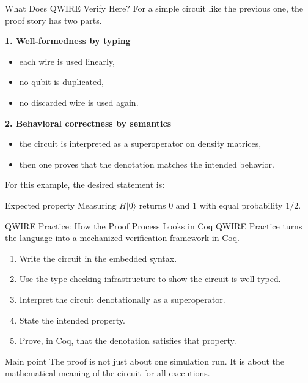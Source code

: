 \documentclass[aspectratio=169]{beamer}
\begin{document}
\begin{frame}{What Does QWIRE Verify Here?}
\justifying
For a simple circuit like the previous one, the proof story has two parts.

\vspace{0.7em}
\textbf{1. Well-formedness by typing}
\begin{itemize}
    \item each wire is used linearly,
    \item no qubit is duplicated,
    \item no discarded wire is used again.
\end{itemize}

\vspace{0.5em}
\textbf{2. Behavioral correctness by semantics}
\begin{itemize}
    \item the circuit is interpreted as a superoperator on density matrices,
    \item then one proves that the denotation matches the intended behavior.
\end{itemize}

\vspace{0.7em}
For this example, the desired statement is:
\begin{block}{Expected property}
Measuring \(H\lvert 0 \rangle\) returns \(0\) and \(1\) with equal probability \(1/2\).
\end{block}
\end{frame}
\begin{frame}{QWIRE Practice: How the Proof Process Looks in Coq}
\justifying
QWIRE Practice turns the language into a mechanized verification framework in Coq.

\vspace{0.7em}
\begin{enumerate}
    \item Write the circuit in the embedded syntax.
    \item Use the type-checking infrastructure to show the circuit is well-typed.
    \item Interpret the circuit denotationally as a superoperator.
    \item State the intended property.
    \item Prove, in Coq, that the denotation satisfies that property.
\end{enumerate}

\vspace{0.7em}
\begin{alertblock}{Main point}
The proof is not just about one simulation run.  
It is about the mathematical meaning of the circuit for all executions.
\end{alertblock}
\end{frame}
\end{document}
